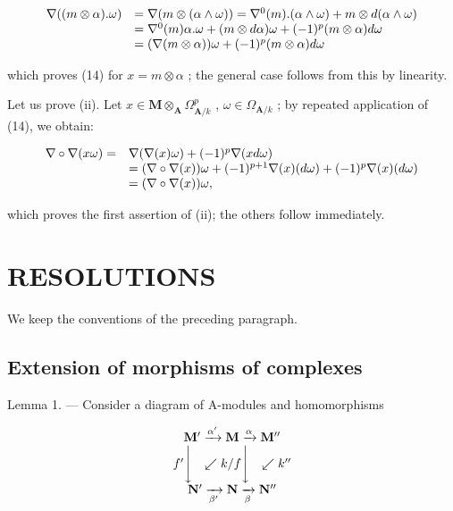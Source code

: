 \[
\begin{array}{r l} \nabla ((m \otimes \alpha). \omega) & = \nabla (m \otimes (\alpha \wedge \omega)) = \nabla^ {0} (m). (\alpha \wedge \omega) + m \otimes d (\alpha \wedge \omega) \\ & = \nabla^ {0} (m) \alpha . \omega + (m \otimes d \alpha) \omega + (- 1) ^ {p} (m \otimes \alpha) d \omega \\ & = (\nabla (m \otimes \alpha)) \omega + (- 1) ^ {p} (m \otimes \alpha) d \omega \end{array}
\]

which proves (14) for \(x = m \otimes \alpha\) ; the general case follows from this by linearity.

Let us prove (ii). Let \(x \in \mathbf{M} \otimes_{\mathbf{A}} \Omega_{\mathbf{A}/k}^{p}\) , \(\omega \in \Omega_{\mathbf{A}/k}\) ; by repeated application of (14), we obtain:

\[
\begin{array}{r l} \nabla \circ \nabla (x \omega) = & \nabla (\nabla (x) \omega) + (- 1) ^ {p} \nabla (x d \omega) \\ & = (\nabla \circ \nabla (x)) \omega + (- 1) ^ {p + 1} \nabla (x) (d \omega) + (- 1) ^ {p} \nabla (x) (d \omega) \\ & = (\nabla \circ \nabla (x)) \omega , \end{array}
\]

which proves the first assertion of (ii); the others follow immediately.

\section{RESOLUTIONS}

We keep the conventions of the preceding paragraph.

\subsection{Extension of morphisms of complexes}

Lemma 1. --- Consider a diagram of A-modules and homomorphisms

\[
\begin{array}{c} \mathbf {M} ^ {\prime} \xrightarrow {\alpha^ {\prime}} \mathbf {M} \xrightarrow {\alpha} \mathbf {M} ^ {\prime \prime} \\ f ^ {\prime} \Biggl \downarrow \quad \swarrow k / f \Biggl \downarrow \quad \swarrow k ^ {\prime \prime} \\ \mathbf {N} ^ {\prime} \xrightarrow [ \beta^ {\prime} ]{} \mathbf {N} \xrightarrow [ \beta ]{} \mathbf {N} ^ {\prime \prime} \end{array}
\]

